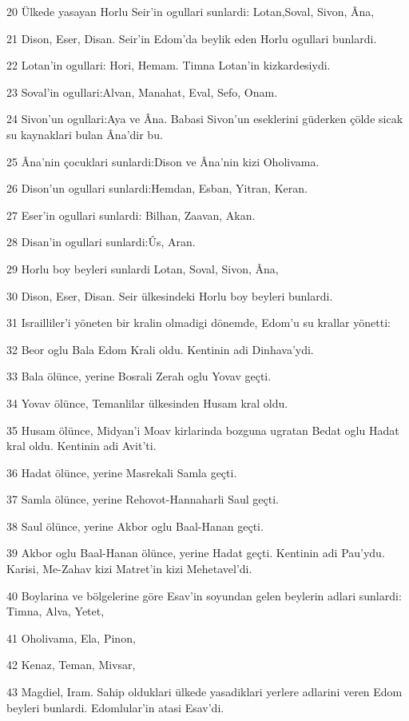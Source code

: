 \par 20 Ülkede yasayan Horlu Seir'in ogullari sunlardi: Lotan,Soval, Sivon, Âna,
\par 21 Dison, Eser, Disan. Seir'in Edom'da beylik eden Horlu ogullari bunlardi.
\par 22 Lotan'in ogullari: Hori, Hemam. Timna Lotan'in kizkardesiydi.
\par 23 Soval'in ogullari:Alvan, Manahat, Eval, Sefo, Onam.
\par 24 Sivon'un ogullari:Aya ve Âna. Babasi Sivon'un eseklerini güderken çölde sicak su kaynaklari bulan Âna'dir bu.
\par 25 Âna'nin çocuklari sunlardi:Dison ve Âna'nin kizi Oholivama.
\par 26 Dison'un ogullari sunlardi:Hemdan, Esban, Yitran, Keran.
\par 27 Eser'in ogullari sunlardi: Bilhan, Zaavan, Akan.
\par 28 Disan'in ogullari sunlardi:Ûs, Aran.
\par 29 Horlu boy beyleri sunlardi Lotan, Soval, Sivon, Âna,
\par 30 Dison, Eser, Disan. Seir ülkesindeki Horlu boy beyleri bunlardi.
\par 31 Israilliler'i yöneten bir kralin olmadigi dönemde, Edom'u su krallar yönetti:
\par 32 Beor oglu Bala Edom Krali oldu. Kentinin adi Dinhava'ydi.
\par 33 Bala ölünce, yerine Bosrali Zerah oglu Yovav geçti.
\par 34 Yovav ölünce, Temanlilar ülkesinden Husam kral oldu.
\par 35 Husam ölünce, Midyan'i Moav kirlarinda bozguna ugratan Bedat oglu Hadat kral oldu. Kentinin adi Avit'ti.
\par 36 Hadat ölünce, yerine Masrekali Samla geçti.
\par 37 Samla ölünce, yerine Rehovot-Hannaharli Saul geçti.
\par 38 Saul ölünce, yerine Akbor oglu Baal-Hanan geçti.
\par 39 Akbor oglu Baal-Hanan ölünce, yerine Hadat geçti. Kentinin adi Pau'ydu. Karisi, Me-Zahav kizi Matret'in kizi Mehetavel'di.
\par 40 Boylarina ve bölgelerine göre Esav'in soyundan gelen beylerin adlari sunlardi: Timna, Alva, Yetet,
\par 41 Oholivama, Ela, Pinon,
\par 42 Kenaz, Teman, Mivsar,
\par 43 Magdiel, Iram. Sahip olduklari ülkede yasadiklari yerlere adlarini veren Edom beyleri bunlardi. Edomlular'in atasi Esav'di.

